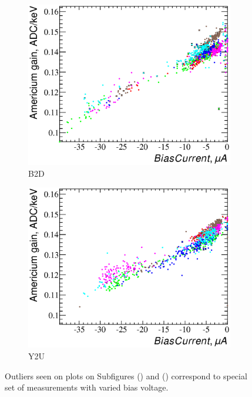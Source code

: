 \documentclass[a4paper,12pt]{article}
\begin{document}
\begin{figure}
\begin{subfigure}[b]{0.5\textwidth}
\includegraphics[width=\textwidth]{gfx/run13_alpha_study_novoltagevariation/B2D/c_hBiasCurrent_AmGain.eps}
\caption{B2D}\label{bc_vs_gain-b2d}
\end{subfigure}
\begin{subfigure}[b]{0.5\textwidth}
\includegraphics[width=\textwidth]{gfx/run13_alpha_study_novoltagevariation/Y2U/c_hBiasCurrent_AmGain.eps}
\caption{Y2U}\label{bc_vs_gain-y2u}
\end{subfigure}

\caption{\bcvsgainlabel{}
Outliers seen on plots on Subfigures () and ()
correspond to special set of measurements with varied bias voltage.
}
\label{fig:bc_vs_gain}
\end{figure}
\end{document}
